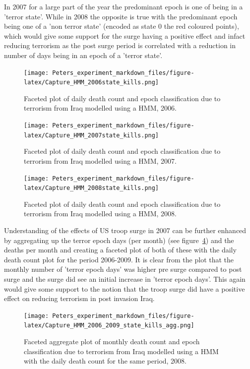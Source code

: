 In 2007 for a large part of the year the predominant epoch is one of being in a 'terror state'. While in 2008 the opposite is true with the predominant epoch being one of a 'non terror state' (encoded as state 0 the red coloured points), which would give some support for the  surge having a positive effect and infact reducing terrorism as the post surge period is correlated with a reduction in number of days being in an epoch of a 'terror state'.

\begin{figure}[t]
\texttt{[image: Peters\_experiment\_markdown\_files/figure-latex/Capture\_HMM\_2006state\_kills.png]}
\caption{Faceted plot of daily death count and epoch classification due to terrorism from Iraq modelled using a HMM, 2006.}
\label{fig:Rplot02_2006_facstate_HMM}
\centering
\end{figure}


\begin{figure}[t]
\texttt{[image: Peters\_experiment\_markdown\_files/figure-latex/Capture\_HMM\_2007state\_kills.png]}
\caption{Faceted plot of daily death count and epoch classification due to terrorism from Iraq modelled using a HMM, 2007.}
\label{fig:Rplot02_2007_facstate_HMM}
\centering
\end{figure}

\begin{figure}[t]
\texttt{[image: Peters\_experiment\_markdown\_files/figure-latex/Capture\_HMM\_2008state\_kills.png]}
\caption{Faceted plot of daily death count and epoch classification due to terrorism from Iraq modelled using a HMM, 2008.}
\label{fig:Rplot02_2008_facstate_HMM}
\centering
\end{figure}

Understanding of the effects of US troop surge in 2007 can be further enhanced by aggregating up the terror epoch days (per month) (see figure~\ref{fig:Rplot02_2008_facstate_HMM_agg}) and the deaths per month and creating a faceted plot of both of these with the daily death count plot for the period 2006-2009. It is clear from the plot that the monthly number of 'terror epoch days' was higher pre surge compared to post surge and the surge did see an initial increase in 'terror epoch days'. This again would give some support to the notion that the troop surge did have a positive effect on reducing terrorism in post invasion Iraq.

\begin{figure}[t]
\texttt{[image: Peters\_experiment\_markdown\_files/figure-latex/Capture\_HMM\_2006\_2009\_state\_kills\_agg.png]}
\caption{Faceted aggregate plot of monthly death count and epoch classification due to terrorism from Iraq modelled using a HMM with the daily death count for the same period, 2008.}
\label{fig:Rplot02_2008_facstate_HMM_agg}
\centering
\end{figure}


